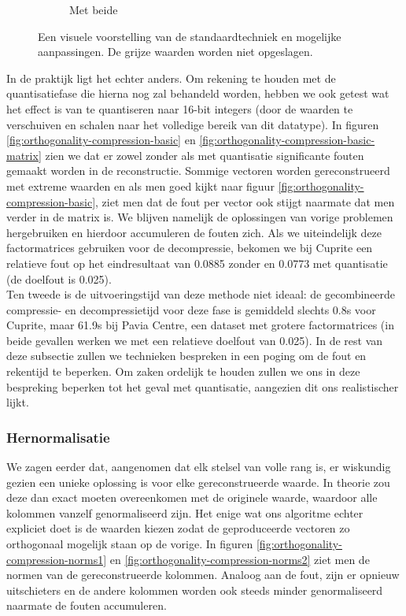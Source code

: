 \begin{figure}[]
\begin{subfigure}{.22\textwidth}
  \caption{Met beide}
  \label{fig:orthogonality_compression_visual_blocks_margin}
\end{subfigure}
\caption{Een visuele voorstelling van de standaardtechniek en mogelijke aanpassingen. De grijze waarden worden niet opgeslagen.}
\label{fig:orthogonality_compression_visual}
\end{figure}

In de praktijk ligt het echter anders. Om rekening te houden met de quantisatiefase die hierna nog zal behandeld worden, hebben we ook getest wat het effect is van te quantiseren naar 16-bit integers (door de waarden te verschuiven en schalen naar het volledige bereik van dit datatype). In figuren \ref{fig:orthogonality-compression-basic} en \ref{fig:orthogonality-compression-basic-matrix} zien we dat er zowel zonder als met quantisatie significante fouten gemaakt worden in de reconstructie. Sommige vectoren worden gereconstrueerd met extreme waarden en als men goed kijkt naar figuur \ref{fig:orthogonality-compression-basic}, ziet men dat de fout per vector ook stijgt naarmate dat men verder in de matrix is. We blijven namelijk de oplossingen van vorige problemen hergebruiken en hierdoor accumuleren de fouten zich. Als we uiteindelijk deze factormatrices gebruiken voor de decompressie, bekomen we bij Cuprite een relatieve fout op het eindresultaat van 0.0885 zonder en 0.0773 met quantisatie (de doelfout is 0.025).\\

Ten tweede is de uitvoeringstijd van deze methode niet ideaal: de gecombineerde compressie- en decompressietijd voor deze fase is gemiddeld slechts 0.8s voor Cuprite, maar 61.9s bij Pavia Centre, een dataset met grotere factormatrices (in beide gevallen werken we met een relatieve doelfout van 0.025). In de rest van deze subsectie zullen we technieken bespreken in een poging om de fout en rekentijd te beperken. Om zaken ordelijk te houden zullen we ons in deze bespreking beperken tot het geval met quantisatie, aangezien dit ons realistischer lijkt.

\subsubsection{Hernormalisatie}

We zagen eerder dat, aangenomen dat elk stelsel van volle rang is, er wiskundig gezien een unieke oplossing is voor elke gereconstrueerde waarde. In theorie zou deze dan exact moeten overeenkomen met de originele waarde, waardoor alle kolommen vanzelf genormaliseerd zijn. Het enige wat ons algoritme echter expliciet doet is de waarden kiezen zodat de geproduceerde vectoren zo orthogonaal mogelijk staan op de vorige. In figuren \ref{fig:orthogonality-compression-norms1} en \ref{fig:orthogonality-compression-norms2} ziet men de normen van de gereconstrueerde kolommen. Analoog aan de fout, zijn er opnieuw uitschieters en de andere kolommen worden ook steeds minder genormaliseerd naarmate de fouten accumuleren.\\

